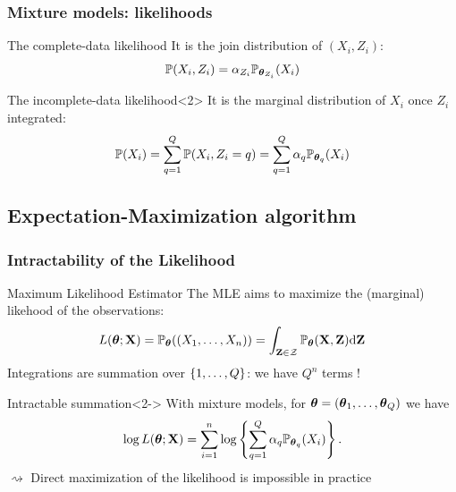 \documentclass{beamer}\usepackage[]{graphicx}\usepackage[]{color}
\begin{document}
\begin{frame}
  \frametitle{Mixture models: likelihoods}

  \begin{block}{The complete-data likelihood}
    It is the join distribution of $(X_i,Z_i)$:
    \begin{equation*}
      \mathbb{P}(X_i,Z_i) = \alpha_{Z_i} \mathbb{P}_{\boldsymbol\theta_{{Z_i}}}(X_i)
    \end{equation*}
  \end{block}

  \vspace{-.25cm}

  \begin{block}{The incomplete-data likelihood}<2>
    It is the marginal distribution of $X_i$ once $Z_i$ integrated:
    \begin{equation*}
      \mathbb{P}(X_i) = \sum_{q=1}^Q \mathbb{P}(X_i, Z_i = q)  = \sum_{q=1}^Q \alpha_q \mathbb{P}_{\boldsymbol\theta_q}(X_i)
    \end{equation*}
  \end{block}

  \vspace{-.25cm}


\end{frame}

\subsection{Expectation-Maximization algorithm}

\begin{frame}
  \frametitle{Intractability of the Likelihood}

  \begin{block}{Maximum Likelihood Estimator}
    The MLE aims to maximize the (marginal) likehood of the observations:
    \begin{equation*}
      L(\boldsymbol\theta; \mathbf{X}) = \mathbb{P}_{\boldsymbol\theta}((X_1,\dots,X_n)) = \int_{\mathbf{Z} \in \mathcal{Z}} \mathbb{P}_{\boldsymbol\theta}(\mathbf{X},\mathbf{Z}) \mathrm{d} \mathbf{Z}
    \end{equation*}
    Integrations are summation over $\left\{1,\dots,Q\right\}$: we have $Q^n$ terms !
  \end{block}

  \vfill

  \begin{block}{Intractable summation}<2->
    With mixture models, for $\boldsymbol\theta = (\boldsymbol\theta_1,\dots,\boldsymbol\theta_Q)$ we have
    \begin{equation*}
      \log L(\boldsymbol\theta; \mathbf{X}) = \sum_{i=1}^n \log \left\{\sum_{q=1}^Q \alpha_q \mathbb{P}_{\boldsymbol\theta_q}(X_i)\right\}.
    \end{equation*}
    \alert{$\rightsquigarrow$ Direct maximization of the likelihood is impossible in practice}
  \end{block}

\end{frame}
\end{document}
